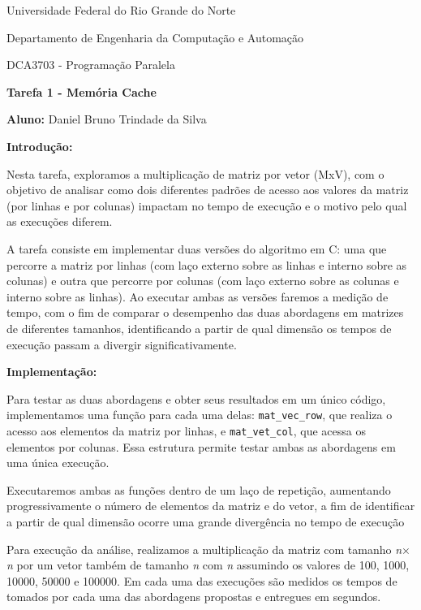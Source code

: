 \documentclass[a4paper, 12pt]{article}
\begin{document}
	\begin{center}
		Universidade Federal do Rio Grande do Norte
		
		Departamento de Engenharia da Computação e Automação
		
		DCA3703 - Programação Paralela
		
		\textbf{Tarefa 1 - Memória Cache}
		
		\textbf{Aluno:} Daniel Bruno Trindade da Silva
	\end{center}
	
	\vspace{0,5cm}
	
	\textbf{Introdução:}
	
	Nesta tarefa, exploramos a multiplicação de matriz por vetor (MxV), com o objetivo de analisar como dois diferentes padrões de acesso aos valores da matriz (por linhas e por colunas) impactam no tempo de execução e o motivo pelo qual as execuções diferem.
	
	
	A tarefa consiste em implementar duas versões do algoritmo em C: uma que percorre a matriz por linhas (com laço externo sobre as linhas e interno sobre as colunas) e outra que percorre por colunas (com laço externo sobre as colunas e interno sobre as linhas). Ao executar ambas as versões faremos a medição de tempo, com o fim de comparar o desempenho das duas abordagens em matrizes de diferentes tamanhos, identificando a partir de qual dimensão os tempos de execução passam a divergir significativamente.
	
	\vspace{0,5cm}
	
	\textbf{Implementação:}
	
	Para testar as duas abordagens e obter seus resultados em um único código, implementamos uma função para cada uma delas: \texttt{mat\_vec\_row}, que realiza o acesso aos elementos da matriz por linhas, e \texttt{mat\_vet\_col}, que acessa os elementos por colunas. Essa estrutura permite testar ambas as abordagens em uma única execução.
	
	Executaremos ambas as funções dentro de um laço de repetição, aumentando progressivamente o número de elementos da matriz e do vetor, a fim de identificar a partir de qual dimensão ocorre uma grande divergência no tempo de execução
	
	Para execução da análise, realizamos a multiplicação da matriz com tamanho \textit{n$\times$n} por um vetor também de tamanho \textit{n} com \textit{n} assumindo os valores de 100, 1000, 10000, 50000 e 100000. Em cada uma das execuções são medidos os tempos de tomados por cada uma das abordagens propostas e entregues em segundos.
	
\end{document}
